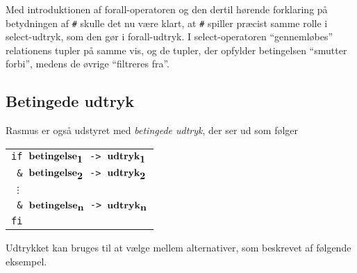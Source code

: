 \documentclass{article}
\newcounter{eks}
\begin{document}

Med introduktionen af forall-operatoren og den dertil h\o{}rende
forklaring p\aa{} betydningen af \verb"#" skulle det nu v\ae{}re
klart, at \verb"#" spiller pr\ae{}cist samme rolle i select-udtryk,
som den g\o{}r i forall-udtryk. I select-operatoren ``genneml\o{}bes''
relationens tupler p\aa{} samme vis, og de tupler, der opfylder
betingelsen ``smutter forbi'', medens de \o{}vrige ``filtreres fra''.

\subsection{Betingede udtryk}
{\sc Rasmus} er ogs\aa{} udstyret med {\em betingede udtryk}, der ser
ud som f\o{}lger
\begin{center}
\begin{tabular}{l}
\verb"if "$\mbox{\bf betingelse}_{\mbox{\bf 1}}$\verb" -> "$\mbox{\bf udtryk}_{\mbox{\bf 1}}$\\
\verb" & "$\mbox{\bf betingelse}_{\mbox{\bf 2}}$\verb" -> "$\mbox{\bf udtryk}_{\mbox{\bf 2}}$\\
\verb" "$\vdots$\\
\verb" & "$\mbox{\bf betingelse}_{\mbox{\bf n}}$\verb" -> "$\mbox{\bf udtryk}_{\mbox{\bf n}}$\\
\verb"fi"
\end{tabular}
\end{center}
Udtrykket kan bruges til at v\ae{}lge mellem alternativer, som
beskrevet af f\o{}lgende eksempel.

\end{document}

